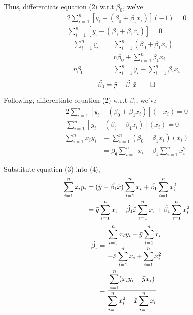 \documentclass{article}
\begin{document}
\paragraph{}
Thus, differentiate equation (2) w.r.t $\beta_0$, we've
\begin{gather*}
2\displaystyle\sum_{i=1}^{n} [y_i-(\beta_0 + \beta_1 x_i)](-1) = 0 \\
\displaystyle\sum_{i=1}^{n} [y_i-(\beta_0 + \beta_1 x_i)] = 0
\end{gather*}
\begin{align*}
\displaystyle\sum_{i=1}^{n} y_i &= \displaystyle\sum_{i=1}^{n}(\beta_0 + \beta_1 x_i) \\
&= n\beta_0 + \displaystyle\sum_{i=1}^{n} \beta_1 x_i \\
n\beta_0 &= \displaystyle\sum_{i=1}^{n} y_i - \displaystyle\sum_{i=1}^{n} \beta_1 x_i 
\end{align*}
\begin{equation}
\hat{\beta_0} = \Bar{y}-\hat{\beta_1}\Bar{x} \qed
\end{equation}

Following, differentiate equation (2) w.r.t $\beta_1$, we've
\begin{gather*}
2\displaystyle\sum_{i=1}^{n} [y_i-(\beta_0 + \beta_1 x_i)](-x_i) = 0 \\
\displaystyle\sum_{i=1}^{n} [y_i-(\beta_0 + \beta_1 x_i)](x_i) = 0 
\end{gather*}
\begin{equation}
\begin{split}
\displaystyle\sum_{i=1}^{n} x_i y_i &= \displaystyle\sum_{i=1}^{n} (\beta_0 + \beta_1 x_i)(x_i) \\
&= \beta_0 \displaystyle\sum_{i=1}^{n} x_i + \beta_1 \displaystyle\sum_{i=1}^{n} x_i^2
\end{split}
\end{equation}

Substitute equation (3) into (4),
\begin{align*}
\displaystyle\sum_{i=1}^{n} x_i y_i &= (\Bar{y}-\hat{\beta_1}\Bar{x})\displaystyle\sum_{i=1}^{n} x_i + \hat{\beta_1} \displaystyle\sum_{i=1}^{n} x_i^2  \\
&= \Bar{y}\displaystyle\sum_{i=1}^{n} x_i - \hat{\beta_1}\Bar{x}\displaystyle\sum_{i=1}^{n} x_i + \hat{\beta_1}\displaystyle\sum_{i=1}^{n} x_i^2 
\end{align*}
\begin{align}
\hat{\beta_1} &= \frac{\displaystyle\sum_{i=1}^{n} x_i y_i - \Bar{y}\displaystyle\sum_{i=1}^{n}x_i}{-\Bar{x}\displaystyle\sum_{i=1}^{n}x_i +\displaystyle\sum_{i=1}^{n}x_i^2} \nonumber \\
&= \frac{\displaystyle\sum_{i=1}^{n} (x_i y_i - \Bar{y}x_i)}{\displaystyle\sum_{i=1}^{n} {x_i^2 - \Bar{x}\displaystyle\sum_{i=1}^{n}x_i}}
\end{align}
\end{document}
